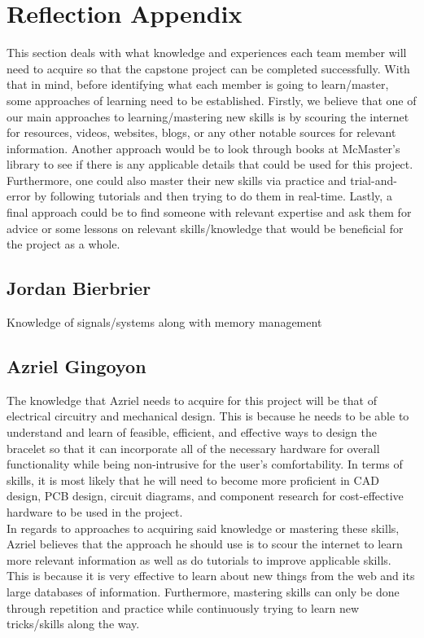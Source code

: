 \documentclass[12pt]{article}
\begin{document}
\section*{Reflection Appendix}
This section deals with what knowledge and experiences each team member will need 
to acquire so that the capstone project can be completed successfully. With that in 
mind, before identifying what each member is going to learn/master, some approaches 
of learning need to be established. Firstly, we believe that one of our main approaches 
to learning/mastering new skills is by scouring the internet for resources, videos, websites, 
blogs, or any other notable sources for relevant information. Another approach would be to 
look through books at McMaster's library to see if there is any applicable details that could 
be used for this project. Furthermore, one could also master their new skills via practice 
and trial-and-error by following tutorials and then trying to do them in real-time. Lastly, a 
final approach could be to find someone with relevant expertise and ask them for advice or 
some lessons on relevant skills/knowledge that would be beneficial for the project as a whole.

\subsection*{Jordan Bierbrier}
Knowledge of signals/systems along with memory management \\

\subsection*{Azriel Gingoyon}
The knowledge that Azriel needs to acquire for this project will be that of electrical 
circuitry and mechanical design. This is because he needs to be able to understand and 
learn of feasible, efficient, and effective ways to design the bracelet so that it can 
incorporate all of the necessary hardware for overall functionality while being non-intrusive 
for the user's comfortability. In terms of skills, it is most likely that he will need to 
become more proficient in CAD design, PCB design, circuit diagrams, and component research for 
cost-effective hardware to be used in the project.\\
In regards to approaches to acquiring said knowledge or mastering these skills, Azriel believes
that the approach he should use is to scour the internet to learn more relevant information as 
well as do tutorials to improve applicable skills. This is because it is very effective to learn 
about new things from the web and its large databases of information. Furthermore, mastering skills 
can only be done through repetition and practice while continuously trying to learn new tricks/skills 
along the way.
\end{document}
